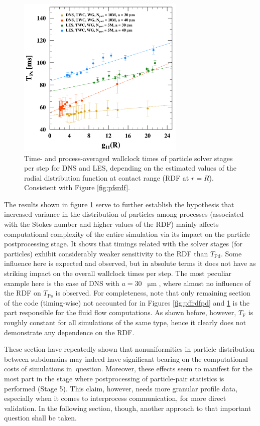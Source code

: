 \documentclass{pracamgren}
\begin{document}
\begin{figure}[h]
\centering
\includegraphics[width=8cm]{img/plots/3-3i-pffrdfps.pdf}
\caption{
Time- and process-averaged wallclock times of particle solver stages per step for DNS and LES, depending on the estimated values of the radial distribution function at contact range (RDF at $r=R$).
Consistent with Figure \ref{fig:pfsrdf}.
}
\label{fig:pffrdfps}
\end{figure}

The results shown in figure \ref{fig:pffrdfps} serve to further establish the hypothesis that increased variance in the distribution of particles among processes (associated with the Stokes number and higher values of the RDF) mainly affects computational complexity of the entire simulation via its impact on the particle postprocessing stage.
It shows that timings related with the solver stages (for particles) exhibit considerably weaker sensitivity to the RDF than $T_{\text{Pd}}$.
Some influence here is expected and observed, but in absolute terms it does not have as striking impact on the overall wallclock times per step.
The most peculiar example here is the case of DNS with $a = 30$~$\upmu\text{m}$, where almost no influence of the RDF on $T_{\text{Ps}}$ is observed.
For completeness, note that only remaining section of the code (timing-wise) not accounted for in Figures \ref{fig:pffrdfpd} and \ref{fig:pffrdfps} is the part responsible for the fluid flow computations.
As shown before, however, $T_{\text{F}}$ is roughly constant for all simulations of the same type, hence it clearly does not demonstrate any dependence on the RDF.

These section have repeatedly shown that nonuniformities in particle distribution between subdomains may indeed have significant bearing on the computational costs of simulations in~question.
Moreover, these effects seem to manifest for the most part in the stage where postprocessing of particle-pair statistics is performed (Stage 5).
This claim, however, needs more granular profile data, especially when it comes to interprocess communication, for more direct validation.
In the following section, though, another approach to that important question shall be taken.
\end{document}
